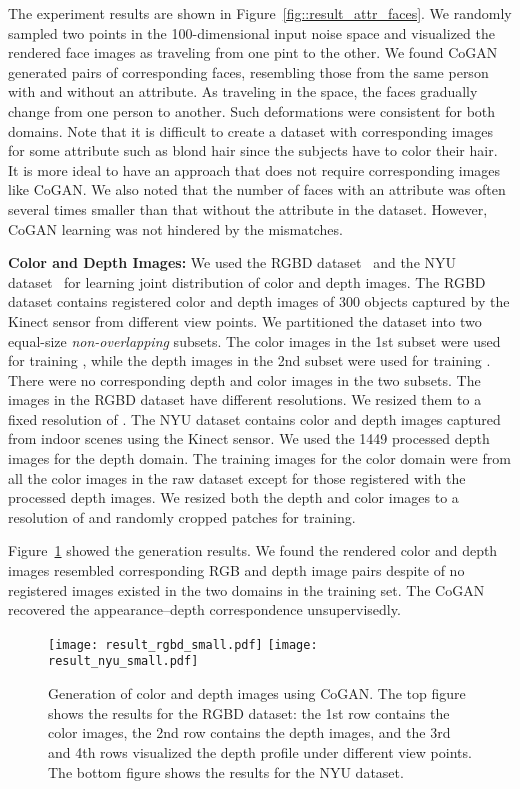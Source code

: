 \documentclass{article}
\begin{document}
The experiment results are shown in Figure~\ref{fig::result_attr_faces}. We randomly sampled two points in the 100-dimensional input noise space and visualized the rendered face images as traveling from one pint to the other. We found CoGAN generated pairs of corresponding faces, resembling those from the same person with and without an attribute. As traveling in the space, the faces gradually change from one person to another. Such deformations were consistent for both domains. Note that it is difficult to create a dataset with corresponding images for some attribute such as blond hair since the subjects have to color their hair. It is more ideal to have an approach that does not require corresponding images like CoGAN. We also noted that the number of faces with an attribute was often several times smaller than that without the attribute in the dataset. However, CoGAN learning was not hindered by the mismatches.

{\bf Color and Depth Images:} We used the RGBD dataset~\cite{lai2011large} and the NYU dataset~\cite{silberman2012indoor} for learning joint distribution of color and depth images. The RGBD dataset contains registered color and depth images of 300 objects captured by the Kinect sensor from different view points. We partitioned the dataset into two equal-size {\it non-overlapping} subsets. The color images in the 1st subset were used for training , while the depth images in the 2nd subset were used for training . There were no corresponding depth and color images in the two subsets. The images in the RGBD dataset have different resolutions. We resized them to a fixed resolution of . The NYU dataset contains color and depth images captured from indoor scenes using the Kinect sensor. We used the 1449 processed depth images for the depth domain. The training images for the color domain were from all the color images in the raw dataset except for those registered with the processed depth images. We resized both the depth and color images to a resolution of  and randomly cropped  patches for training. 

Figure~\ref{fig::result_rgbd} showed the generation results. We found the rendered color and depth images resembled corresponding RGB and depth image pairs despite of no registered images existed in the two domains in the training set. The CoGAN recovered the appearance--depth correspondence unsupervisedly.

\begin{figure}[t!]
\centering
\texttt{[image: result\_rgbd\_small.pdf]}
\texttt{[image: result\_nyu\_small.pdf]}
\caption{\small Generation of color and depth images using CoGAN. The top figure shows the results for the RGBD dataset: the 1st row contains the color images, the 2nd row contains the depth images, and the 3rd and 4th rows visualized the depth profile under different view points. The bottom figure shows the results for the NYU dataset.}
\label{fig::result_rgbd}
\vspace{-2mm}
\end{figure}
\end{document}
